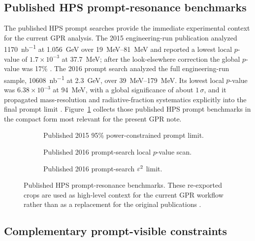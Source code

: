 \subsection{Published HPS prompt-resonance benchmarks}

The published HPS prompt searches provide the immediate experimental context for the
current GPR analysis. The 2015 engineering-run publication analyzed
\SI{1170}{nb^{-1}} at \SI{1.056}{GeV} over \SIrange{19}{81}{MeV} and reported a lowest
local $p$-value of $1.7\times10^{-3}$ at \SI{37.7}{MeV}; after the look-elsewhere
correction the global $p$-value was 17\%
\cite{HPS2015DarkPhoton}. The 2016 prompt search analyzed the full engineering-run
sample, \SI{10608}{nb^{-1}} at \SI{2.3}{GeV}, over \SIrange{39}{179}{MeV}. Its lowest
local $p$-value was $6.38\times10^{-3}$ at \SI{94}{MeV}, with a global significance of
about $1\,\sigma$, and it propagated mass-resolution and radiative-fraction
systematics explicitly into the final prompt limit \cite{HPS2016PromptLong}.
Figure~\ref{fig:published-hps-context} collects those published HPS prompt benchmarks
in the compact form most relevant for the present GPR note.

\begin{figure}[H]
\centering
\begin{subfigure}[t]{0.32\linewidth}
  \centering
  \caption{Published 2015 95\% power-constrained prompt limit.}
\end{subfigure}
\hfill
\begin{subfigure}[t]{0.32\linewidth}
  \centering
  \caption{Published 2016 prompt-search local $p$-value scan.}
\end{subfigure}
\hfill
\begin{subfigure}[t]{0.32\linewidth}
  \centering
  \caption{Published 2016 prompt-search $\varepsilon^2$ limit.}
\end{subfigure}
\caption{Published HPS prompt-resonance benchmarks. These re-exported crops are used as
high-level context for the current GPR workflow rather than as a replacement for the
original publications \cite{HPS2015DarkPhoton,HPS2016PromptLong}.}
\label{fig:published-hps-context}
\end{figure}

\subsection{Complementary prompt-visible constraints}

